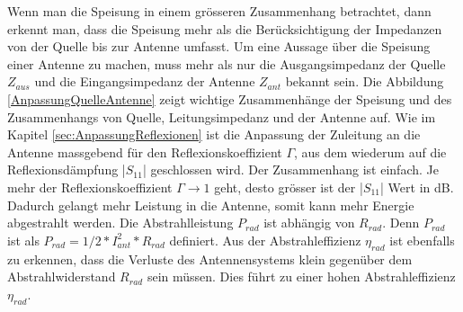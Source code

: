 Wenn man die Speisung in einem grösseren Zusammenhang betrachtet, dann erkennt man, dass die Speisung mehr als die Berücksichtigung der Impedanzen von der Quelle bis zur Antenne umfasst. Um eine Aussage über die Speisung einer Antenne zu machen, muss mehr als nur die Ausgangsimpedanz der Quelle $Z_{aus}$ und die Eingangsimpedanz der Antenne $Z_{ant}$ bekannt sein. Die Abbildung \ref{AnpassungQuelleAntenne} zeigt wichtige Zusammenhänge der Speisung und des Zusammenhangs von Quelle, Leitungsimpedanz und der Antenne auf. Wie im Kapitel \ref{sec:AnpassungReflexionen} ist die Anpassung der Zuleitung an die Antenne massgebend für den Reflexionskoeffizient $\Gamma$, aus dem wiederum auf die Reflexionsdämpfung |$S_{11}$| geschlossen wird. Der Zusammenhang ist einfach. Je mehr der Reflexionskoeffizient $\Gamma\rightarrow 1$ geht, desto grösser ist der |$S_{11}$| Wert in dB. Dadurch gelangt mehr Leistung in die Antenne, somit kann mehr Energie abgestrahlt werden. Die Abstrahlleistung $P_{rad}$ ist abhängig von $R_{rad}$. Denn $P_{rad}$ ist als $P_{rad}=1/2*I_{ant}^2*R_{rad}$ definiert. Aus der Abstrahleffizienz $\eta_{rad}$ ist ebenfalls zu erkennen, dass die Verluste des Antennensystems klein gegenüber dem Abstrahlwiderstand $R_{rad}$ sein müssen. Dies führt zu einer hohen Abstrahleffizienz $\eta_{rad}$.

